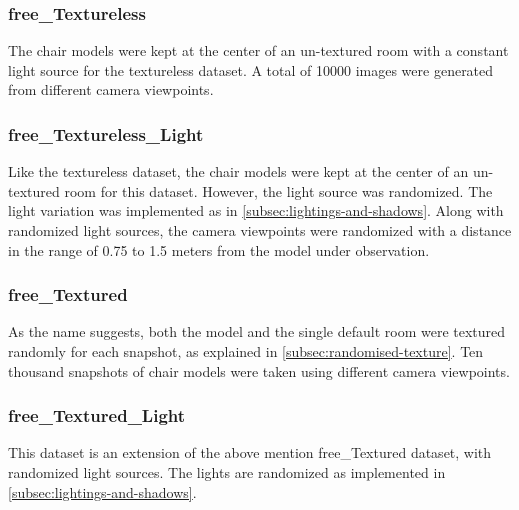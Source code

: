 
\subsubsection{\gls{free}\_Textureless}

The chair models were kept at the center of an un-textured room with a constant light source for the textureless dataset.
A total of 10000 images were generated from different camera viewpoints.

\subsubsection{\gls{free}\_Textureless\_Light}

Like the textureless dataset, the chair models were kept at the center of an un-textured room for this dataset.
However, the light source was randomized.
The light variation was implemented as in \autoref{subsec:lightings-and-shadows}.
Along with randomized light sources, the camera viewpoints were randomized with a distance in the range of 0.75 to 1.5 meters from the model under observation.

\subsubsection{\gls{free}\_Textured}

As the name suggests, both the model and the single default room were textured randomly for each snapshot, as explained in \autoref{subsec:randomised-texture}.
Ten thousand snapshots of chair models were taken using different camera viewpoints.

\subsubsection{\gls{free}\_Textured\_Light}

This dataset is an extension of the above mention \gls{free}\_Textured dataset, with randomized light sources.
The lights are randomized as implemented in \autoref{subsec:lightings-and-shadows}.

